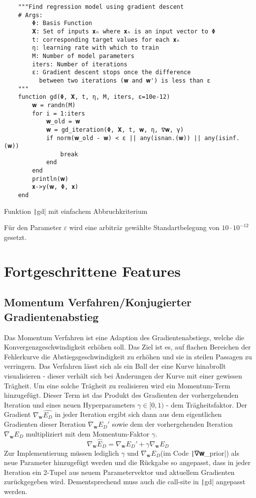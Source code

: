 \documentclass{article}
\theoremstyle{plain} %
\theoremstyle{definition} %
\begin{document}
\begin{listing}[!ht]
  \begin{verbatim} 
    """Find regression model using gradient descent
    # Args:
        Φ: Basis Function
        𝐗: Set of inputs 𝐱ₙ where 𝐱ₙ is an input vector to Φ
        t: corresponding target values for each 𝐱ₙ
        η: learning rate with which to train
        M: Number of model parameters
        iters: Number of iterations
        ε: Gradient descent stops once the difference
          between two iterations (𝐰 and 𝐰') is less than ε
    """
    function gd(Φ, 𝐗, t, η, M, iters, ε=10e-12)
        𝐰 = randn(M)
        for i = 1:iters
            𝐰_old = 𝐰
            𝐰 = gd_iteration(Φ, 𝐗, t, 𝐰, η, ∇𝐰, γ)
            if norm(𝐰_old - 𝐰) < ε || any(isnan.(𝐰)) || any(isinf.(𝐰))
                break
            end
        end
        println(𝐰)
        𝐱->y(𝐰, Φ, 𝐱)
    end
  \end{verbatim}
  \caption{Funktion \texttt|gd| mit einfachem Abbruchkriterium}
  \label{listing:simplebreak}
\end{listing}

Für den Parameter $\varepsilon$ wird eine arbiträr gewählte Standartbelegung von $10\cdot10^{-12}$ gesetzt.

\section{Fortgeschrittene Features}
\subsection{Momentum Verfahren/Konjugierter Gradientenabstieg}
Das Momentum Verfahren ist eine Adaption des Gradientenabstiegs, welche die Konvergenzgeschwindigkeit erhöhen soll. Das Ziel ist es, auf flachen Bereichen der Fehlerkurve die Abstiegsgeschwindigkeit zu erhöhen und sie in steilen Passagen zu verringern. Das Verfahren lässt sich als ein Ball der eine Kurve hinabrollt visualisieren - dieser verhält sich bei Änderungen der Kurve mit einer gewissen Trägheit.
Um eine solche Trägheit zu realisieren wird ein Momentum-Term hinzugefügt. Dieser Term ist das Produkt des Gradienten der vorhergehenden Iteration und eines neuen Hyperparameters $\gamma \in [0,1)$ - dem Trägheitsfaktor. Der Gradient $\nabla_\mathbf{w}\hat{E_D}$ in jeder Iteration ergibt sich dann aus dem eigentlichen Gradienten dieser Iteration $\nabla_\mathbf{w} E_D'$ sowie dem der vorhergehenden Iteration $\nabla_\mathbf{w} E_D$ multipliziert mit dem Momentum-Faktor $\gamma$.
$$
  \nabla_\mathbf{w} \hat{E}_D = \nabla_\mathbf{w} E_D' + \gamma \nabla_\mathbf{w} E_D
$$
Zur Implementierung müssen lediglich $\gamma$ und $\nabla_\mathbf{w} E_D$(im Code \texttt|∇𝐰_prior|) als neue Parameter hinzugefügt werden und die Rückgabe so angepasst, dass in jeder Iteration ein 2-Tupel aus neuem Parametervektor und aktuellem Gradienten zurückgegeben wird. Dementsprechend muss auch die call-site in \texttt|gd| angepasst werden.
\end{document}
